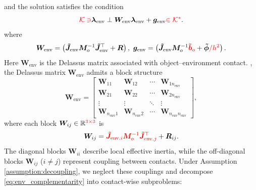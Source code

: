 and the solution satisfies the  condition
\begin{equation}
\textcolor{red}{\mathcal{K}\ni} \boldsymbol{\lambda}_{\text{env}} \perp
\boldsymbol{W}_{\text{env}}
\boldsymbol{\lambda}_{\text{env}}
+\boldsymbol{g}_{\text{env}}
\textcolor{red}{\in\mathcal{K}^{*}}.
\label{eq:env_complementarity}
\end{equation}
\noindent where
\begin{equation}
 \boldsymbol{W}_{\text{env}}=\left(
\boldsymbol{\tilde{J}}_{\text{env}} \boldsymbol{M}_o^{-1} \boldsymbol{\tilde{J}}_{\text{env}}^\top
+\boldsymbol{R}
\right), \ \boldsymbol{g}_{\text{env}}=\left(
\boldsymbol{\tilde{J}}_{\text{env}} \boldsymbol{M}_o^{-1}\textcolor{red}{\boldsymbol{\tilde{b}}_o}
+\boldsymbol{\tilde{\phi}}\textcolor{red}{/h^2}
\right).
\label{eq:delassus_def}
\end{equation}
\noindent Here $\boldsymbol{W}_{\text{env}}$ is the Delassus matrix associated with object–environment contact. , the Delassus matrix $\boldsymbol{W}_{\text{env}}$ admits a block structure
\begin{equation*}
 \boldsymbol{W}_{\text{env}} =
\begin{bmatrix}
\boldsymbol{W}_{11} & \boldsymbol{W}_{12} & \cdots & \boldsymbol{W}_{1n_{\text{env}}} \\
\boldsymbol{W}_{21} & \boldsymbol{W}_{22} & \cdots & \boldsymbol{W}_{2n_{\text{env}}} \\
\vdots & \vdots & \ddots & \vdots \\
\boldsymbol{W}_{n_{\text{env}}1} & \boldsymbol{W}_{n_{\text{env}}2} & \cdots & \boldsymbol{W}_{n_{\text{env}} n_{\text{env}}}
\end{bmatrix},
\end{equation*}
\noindent where each block $\boldsymbol{W}_{ij} \in \mathbb{R}^{\textcolor{red}{3\times 3}}$ is
\begin{equation*}
\boldsymbol{W}_{ij}
=
\textcolor{red}{\boldsymbol{\tilde{J}}_{\text{env},i}
\boldsymbol{M}_o^{-1}
\boldsymbol{\tilde{J}}_{\text{env},j}^{\top}}
+
\boldsymbol{R}_{ij}.
\end{equation*}
\noindent The diagonal blocks $\boldsymbol{W}_{ii}$ describe local effective inertia, while the off-diagonal blocks $\boldsymbol{W}_{ij}$ ($i \neq j$) represent coupling between contacts. Under Assumption \ref{assumption:decoupling}, we neglect these couplings and decompose \eqref{eq:env_complementarity} into contact-wise subproblems:
